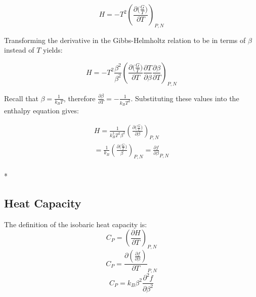 \documentclass[aps,pre,twocolumn,nofootinbib,superscriptaddress,linenumbers,10pt, draft,tightenlines]{revtex4-1}
\begin{document}
\begin{equation}H=-T^2 \left(\frac{\partial \big(\frac{G}{T}\big)}{\partial T}\right)_{P,N}\end{equation}

Transforming the derivative in the Gibbs-Helmholtz relation to be in terms of $\beta$ instead of $T$ yields:

\begin{equation}H=-T^2  \frac{\beta^2}{\beta^2}\left(\frac{\partial \big(\frac{G}{T}\big)}{\partial T} \frac{\partial T}{\partial \beta} \frac{\partial \beta}{\partial T}\right)_{P,N}\end{equation}


Recall that $\beta = \frac{1}{k_B T}$, therefore $\frac{\partial \beta}{\partial T} = - \frac{1}{k_B T^2}$. Substituting these values into the enthalpy equation gives:

\begin{multline}
H = \frac{1}{k_B^3 T^2 \beta^2} \left(\frac{\partial \big(\frac{G}{T}\big)}{\partial \beta}\right)_{P,N} \\ = \frac{1}{k_B} \left(\frac{\partial \big(\frac{G}{T}\big)}{\beta}\right)_{P,N} = \frac{\partial f}{\partial \beta}_{P,N} 
\end{multline}\\*


\subsection{Heat Capacity}
The definition of the isobaric heat capacity is:
\begin{equation}C_P = \left( \frac{\partial H}{\partial T}\right)_{P,N}\end{equation}
\begin{equation}C_P =  \frac{\partial \left(\frac{\partial f}{\partial \beta}\right)}{\partial T}_{P,N}\end{equation}
\begin{equation}C_P = k_B \beta^2 \frac{\partial^2 f}{\partial \beta^2}\end{equation}
\end{document}
